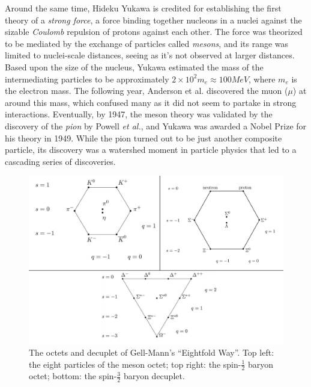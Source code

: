 Around the same time, Hideku Yukawa is credited for establishing the first theory of a \emph{strong force}, a force binding together nucleons in a nuclei against the sizable \emph{Coulomb} repulsion of protons against each other. The force was theorized to be mediated by the exchange of particles called \emph{mesons}, and its range was limited to nuclei-scale distances, seeing as it's not observed at larger distances. Based upon the size of the nucleus, Yukawa estimated the mass of the intermediating particles to be approximately $2 \times 10^2 m_e \approx 100 MeV$, where $m_e$ is the electron mass. The following year, Anderson et al. discovered the muon ($\mu$) at around this mass\CN, which confused many as it did not seem to partake in strong interactions. Eventually, by 1947, the meson theory was validated by the discovery of the \emph{pion} by Powell \emph{et al.}\CN, and Yukawa was awarded a Nobel Prize for his theory in 1949. While the pion turned out to be just another composite particle, its discovery was a watershed moment in particle physics that led to a cascading series of discoveries. 
\begin{figure}
	\centering
	\includegraphics[width=5in]{figures/background/mesons_baryons.pdf}
	\caption{The octets and decuplet of Gell-Mann's ``Eightfold Way''. Top left: the eight particles of the meson octet; top right: the spin-$\frac{1}{2}$ baryon octet; bottom: the spin-$\frac{3}{2}$ baryon decuplet.}
	\label{fig:mesons-baryons}
\end{figure}

